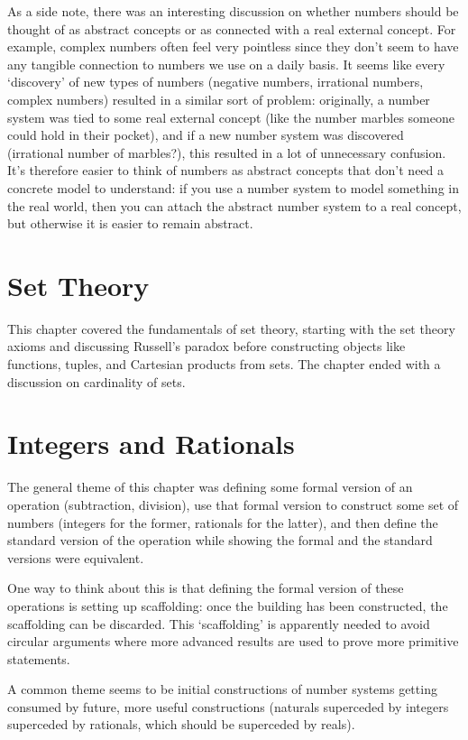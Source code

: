 \documentclass[answers,12pt]{exam}
\begin{document}
As a side note, there was an interesting discussion on whether numbers should be thought of as abstract concepts or as connected with a real external concept.
For example, complex numbers often feel very pointless since they don't seem to have any tangible connection to numbers we use on a daily basis.
It seems like every `discovery' of new types of numbers (negative numbers, irrational numbers, complex numbers) resulted in a similar sort of problem:
originally, a number system was tied to some real external concept (like the number marbles someone could hold in their pocket), and if a new number system was discovered (irrational number of marbles?), this resulted in a lot of unnecessary confusion.
It's therefore easier to think of numbers as abstract concepts that don't need a concrete model to understand:
if you use a number system to model something in the real world, then you can attach the abstract number system to a real concept, but otherwise it is easier to remain abstract.

\section{Set Theory}
This chapter covered the fundamentals of set theory, starting with the set theory axioms and discussing Russell's paradox before constructing objects like functions, tuples, and Cartesian products from sets.
The chapter ended with a discussion on cardinality of sets.

\section{Integers and Rationals}
The general theme of this chapter was defining some formal version of an operation (subtraction, division), use that formal version to construct some set of numbers (integers for the former, rationals for the latter), and then define the standard version of the operation while showing the formal and the standard versions were equivalent.

One way to think about this is that defining the formal version of these operations is setting up scaffolding: once the building has been constructed, the scaffolding can be discarded. This `scaffolding' is apparently needed to avoid circular arguments where more advanced results are used to prove more primitive statements.

A common theme seems to be initial constructions of number systems getting consumed by future, more useful constructions (naturals superceded by integers superceded by rationals, which should be superceded by reals).
\end{document}
